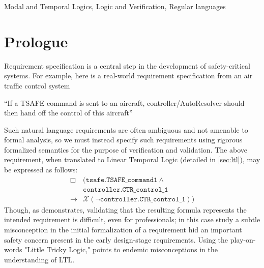\documentclass[conference]{IEEEtran}
\theoremstyle{definition}
\theoremstyle{remark}
\newcommand{\always}{\Box}
\newcommand{\nextt}{\mathcal{X}}
\newcommand{\limplies}{\rightarrow}
\begin{document}
\begin{IEEEkeywords}
Modal and Temporal Logics, Logic and Verification, Regular languages
\end{IEEEkeywords}

\section{Prologue} %
Requirement specification is a central step in the development of safety-critical systems. %
For example, here is a real-world requirement specification from an air traffic control system~\cite{ZR14}
\begin{center}
    ``If a TSAFE command is sent to an aircraft, controller/AutoResolver should then hand off the control of this aircraft''
\end{center}
Such natural language requirements are often ambiguous and not amenable to formal analysis, so we must instead specify such requirements using rigorous formalized semantics for the purpose of verification and validation. The above requirement, when translated to Linear Temporal Logic (detailed in \cref{sec:ltl}), may be expressed as follows:
\begin{align*}
    \always & (\texttt{tsafe.TSAFE\_command1} \land \\ & \texttt{controller.CTR\_control\_1} \\
    \limplies & \nextt (\neg \texttt{controller.CTR\_control\_1}))
\end{align*}
Though, as \cite{ZR14} demonstrates, validating that the resulting formula represents the intended requirement is difficult, even for professionals; in this case study a subtle misconception in the initial formalization of a requirement hid an important safety concern present in the early design-stage requirements. Using the play-on-words "Little Tricky Logic," \cite{GSNK22} points to endemic misconceptions in the understanding of LTL.
\end{document}
